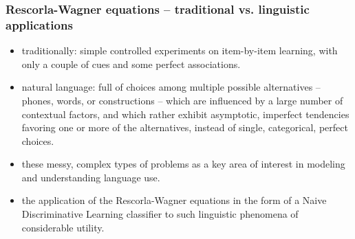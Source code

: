 \begin{frame}
  \frametitle{Rescorla-Wagner equations -- traditional vs. linguistic
    applications}

  \begin{itemize}

  \item traditionally: simple controlled experiments on item-by-item
    learning, with only a couple of cues and some perfect associations.

  \item natural language: full of choices among multiple possible
    alternatives -- phones, words, or constructions -- which are
    influenced by a large number of contextual factors, and which
    rather exhibit asymptotic, imperfect tendencies favoring one or
    more of the alternatives, instead of single, categorical, perfect
    choices.

  \item these messy, complex types of problems as a key area of
    interest in modeling and understanding language use.

  \item the application of the Rescorla-Wagner equations in the form
    of a Naive Discriminative Learning classifier to such linguistic
    phenomena of considerable utility.
    
\end{itemize}

\end{frame}

